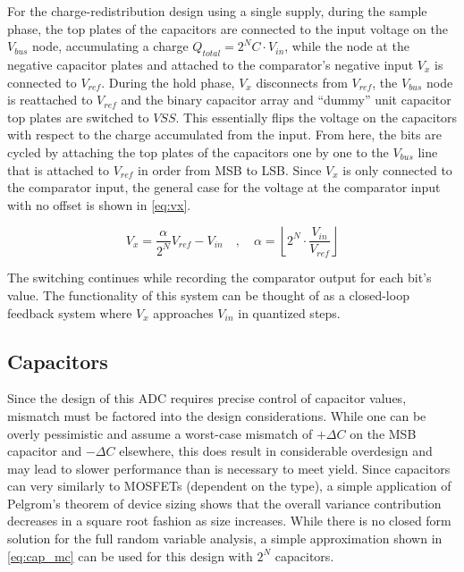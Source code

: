 \documentclass[11pt,letterpaper]{article}
\begin{document}
For the charge-redistribution design using a single supply, during the sample phase, the top plates of the capacitors are connected to the input voltage on the \(V_{bus}\) node, accumulating a charge \(Q_{total} = 2^N C \cdot V_{in}\), while the node at the negative capacitor plates and attached to the comparator's negative input \(V_x\) is connected to \(V_{ref}\). During the hold phase, \(V_x\) disconnects from \(V_{ref}\), the \(V_{bus}\) node is reattached to \(V_{ref}\) and the binary capacitor array and ``dummy'' unit capacitor top plates are switched to \(VSS\). This essentially flips the voltage on the capacitors with respect to the charge accumulated from the input. From here, the bits are cycled by attaching the top plates of the capacitors one by one to the \(V_{bus}\) line that is attached to \(V_{ref}\) in order from MSB to LSB. Since \(V_x\) is only connected to the comparator input, the general case for the voltage at the comparator input with no offset is shown in \cref{eq:vx}.

\begin{equation}
    V_x = \frac{\alpha}{2^N}V_{ref} - V_{in} \quad, \quad \alpha = \left\lfloor 2^N \cdot \frac{V_{in}}{V_{ref}} \right\rfloor \label{eq:vx}
\end{equation}

The switching continues while recording the comparator output for each bit's value. The functionality of this system can be thought of as a closed-loop feedback system where \(V_x\) approaches \(V_{in}\) in quantized steps.

\subsection{Capacitors}

Since the design of this ADC requires precise control of capacitor values, mismatch must be factored into the design considerations. While one can be overly pessimistic and assume a worst-case mismatch of \(+\Delta C\) on the MSB capacitor and \(-\Delta C\) elsewhere, this does result in considerable overdesign and may lead to slower performance than is necessary to meet yield. Since capacitors can very similarly to MOSFETs (dependent on the type), a simple application of Pelgrom's theorem of device sizing shows that the overall variance contribution decreases in a square root fashion as size increases. While there is no closed form solution for the full random variable analysis, a simple approximation shown in \cref{eq:cap_mc} can be used for this design with \(2^N\) capacitors.
\end{document}

